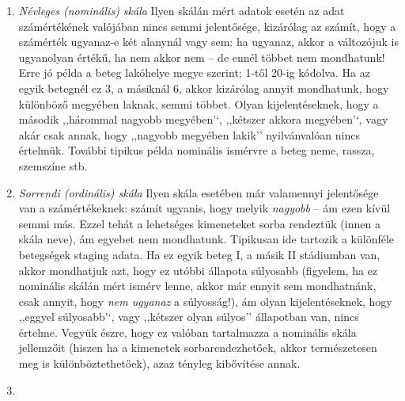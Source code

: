 \documentclass[]{book}
\providecommand{\tightlist}{%
  \setlength{\itemsep}{0pt}\setlength{\parskip}{0pt}}
\begin{document}
\begin{enumerate}
\def\labelenumi{\arabic{enumi}.}
\tightlist
\item
  \emph{Névleges (nominális) skála} Ilyen skálán mért adatok esetén az adat számértékének valójában nincs semmi jelentősége, kizárólag az számít, hogy a számérték ugyanaz-e két alanynál vagy sem: ha ugyanaz, akkor a változójuk is ugyanolyan értékű, ha nem akkor nem -- de ennél többet nem mondhatunk! Erre jó példa a beteg lakóhelye megye szerint; 1-től 20-ig kódolva. Ha az egyik betegnél ez 3, a másiknál 6, akkor kizárólag annyit mondhatunk, hogy különböző megyében laknak, semmi többet. Olyan kijelentéseknek, hogy a második ,,hárommal nagyobb megyében'`, ,,kétszer akkora megyében'`, vagy akár csak annak, hogy ,,nagyobb megyében lakik'' nyilvánvalóan nincs értelmük. További tipikus példa nominális ismérvre a beteg neme, rassza, szemszíne stb.
\item
  \emph{Sorrendi (ordinális) skála} Ilyen skála esetében már valamennyi jelentősége van a számértékeknek: számít ugyanis, hogy melyik \emph{nagyobb} -- ám ezen kívül semmi más. Ezzel tehát a lehetséges kimeneteket sorba rendeztük (innen a skála neve), ám egyebet nem mondhatunk. Tipikusan ide tartozik a különféle betegségek staging adata. Ha ez egyik beteg I, a másik II stádiumban van, akkor mondhatjuk azt, hogy ez utóbbi állapota súlyosabb (figyelem, ha ez nominális skálán mért ismérv lenne, akkor már ennyit sem mondhatnánk, csak annyit, hogy \emph{nem ugyanaz} a súlyosság!), ám olyan kijelentéseknek, hogy ,,eggyel súlyosabb'`, vagy ,,kétszer olyan súlyos'' állapotban van, nincs értelme. Vegyük észre, hogy ez valóban tartalmazza a nominális skála jellemzőit (hiszen ha a kimenetek sorbarendezhetőek, akkor természetesen meg is különböztethetőek), azaz tényleg kibővítése annak.
\item

\end{enumerate}
\end{document}
